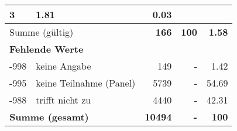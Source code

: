 \begin{longtable}{lXrrr}
       \num{3} &
       \num[round-mode=places,round-precision=2]{1.81} &
         \num[round-mode=places,round-precision=2]{0.03} \\
     \midrule
     \multicolumn{2}{l}{Summe (gültig)} &
       \textbf{\num{166}} &
     \textbf{\num{100}} &
       \textbf{\num[round-mode=places,round-precision=2]{1.58}} \\
     \multicolumn{5}{l}{\textbf{Fehlende Werte}}\\
       -998 &
       keine Angabe &
         \num{149} &
        - &
         \num[round-mode=places,round-precision=2]{1.42} \\
       -995 &
       keine Teilnahme (Panel) &
         \num{5739} &
        - &
         \num[round-mode=places,round-precision=2]{54.69} \\
       -988 &
       trifft nicht zu &
         \num{4440} &
        - &
         \num[round-mode=places,round-precision=2]{42.31} \\
     \midrule
     \multicolumn{2}{l}{\textbf{Summe (gesamt)}} &
          \textbf{\num{10494}} &
        \textbf{-} &
        \textbf{\num{100}} \\
     \bottomrule
     \end{longtable}
     
